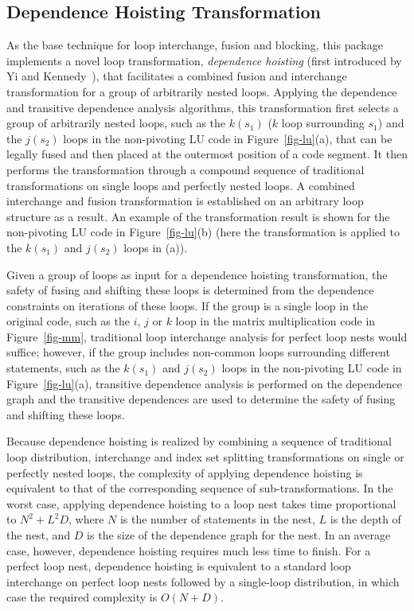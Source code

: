 \subsection {Dependence Hoisting Transformation}
\label {sec-hoisting}

As the base technique for loop interchange, fusion
and blocking, this package implements a novel loop transformation,
{\em dependence hoisting} (first introduced by Yi and Kennedy~\cite{YK:Report}), 
that facilitates a combined fusion and interchange transformation for a group of 
arbitrarily nested loops.
Applying the dependence and transitive dependence analysis
algorithms,
this transformation first selects a group
of arbitrarily nested loops, such as the $k(s_1)$ ($k$ loop surrounding $s_1$)
and the $j(s_2)$ loops in the non-pivoting LU code in
Figure~\ref {fig-lu}(a), that can be legally fused
and then placed at the outermost position of a code
segment.
It then performs the transformation through a compound
sequence of traditional transformations on single loops
and perfectly nested loops. A combined
interchange and fusion transformation is established 
on an arbitrary loop structure as a result. An example of
the transformation result is shown for the non-pivoting
LU code in Figure~\ref {fig-lu}(b) (here the transformation
is applied to the $k(s_1)$ and $j(s_2)$ loops in (a)).

Given a group of loops as input for a dependence hoisting
transformation, the safety of fusing and shifting these loops
is determined from the dependence constraints on iterations
of these loops. If the group is a single loop in the original code,
such as the $i$, $j$ or $k$ loop in the matrix multiplication code
in Figure~\ref{fig-mm}, 
traditional loop interchange analysis for perfect loop nests would suffice;
however, if the group includes non-common loops surrounding different
statements, such as the $k(s_1)$ and $j(s_2)$ loops in the non-pivoting
LU code in Figure~\ref {fig-lu}(a), transitive dependence analysis is performed
on the dependence graph
and the transitive dependences are used to determine
the safety of fusing and shifting these loops. 

Because dependence hoisting is realized by combining
a sequence of traditional loop distribution, interchange
and index set splitting transformations on single
or perfectly nested loops,
the complexity of applying dependence hoisting
is equivalent to that of the corresponding sequence
of sub-transformations.
In the worst case, applying dependence hoisting to
a loop nest takes time proportional to $N^2 + L^2D$,
where $N$ is the number of statements in the nest,
$L$ is the depth of the nest,
and $D$ is the size of the dependence graph for the nest.
In an average case, however, dependence hoisting requires
much less time to finish. For a perfect loop nest,
dependence hoisting is equivalent to a standard
loop interchange on perfect loop nests
followed by a single-loop distribution, in which case
the required complexity is $O(N + D)$.

